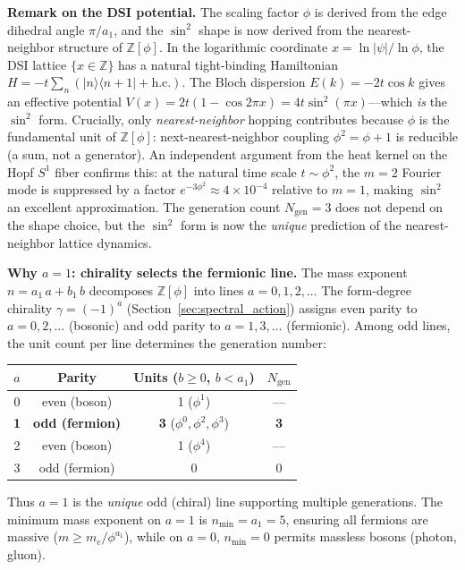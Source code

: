 \documentclass[12pt,a4paper]{article}
\theoremstyle{definition}
\begin{document}
\textbf{Remark on the DSI potential.} The scaling factor $\phi$ is derived from the edge dihedral angle $\pi/a_1$, and the $\sin^2$ shape is now derived from the nearest-neighbor structure of $\mathbb{Z}[\phi]$.  In the logarithmic coordinate $x = \ln|\psi|/\ln\phi$, the DSI lattice $\{x \in \mathbb{Z}\}$ has a natural tight-binding Hamiltonian $H = -t\sum_n(|n\rangle\langle n\!+\!1| + \text{h.c.})$.  The Bloch dispersion $E(k) = -2t\cos k$ gives an effective potential $V(x) = 2t(1 - \cos 2\pi x) = 4t\sin^2(\pi x)$---which \emph{is} the $\sin^2$ form.  Crucially, only \emph{nearest-neighbor} hopping contributes because $\phi$ is the fundamental unit of $\mathbb{Z}[\phi]$: next-nearest-neighbor coupling $\phi^2 = \phi + 1$ is reducible (a sum, not a generator).  An independent argument from the heat kernel on the Hopf $S^1$ fiber confirms this: at the natural time scale $t \sim \phi^2$, the $m = 2$ Fourier mode is suppressed by a factor $e^{-3\phi^2} \approx 4 \times 10^{-4}$ relative to $m = 1$, making $\sin^2$ an excellent approximation.  The generation count $N_{\text{gen}} = 3$ does not depend on the shape choice, but the $\sin^2$ form is now the \emph{unique} prediction of the nearest-neighbor lattice dynamics.

\textbf{Why $a = 1$: chirality selects the fermionic line.}  The mass exponent $n = a_1\,a + b_1\,b$ decomposes $\mathbb{Z}[\phi]$ into lines $a = 0, 1, 2, \ldots$  The form-degree chirality $\gamma = (-1)^a$ (Section~\ref{sec:spectral_action}) assigns even parity to $a = 0, 2, \ldots$ (bosonic) and odd parity to $a = 1, 3, \ldots$ (fermionic).  Among odd lines, the unit count per line determines the generation number:
\begin{center}
\begin{tabular}{cccc}
\toprule
$a$ & Parity & Units ($b \geq 0$, $b < a_1$) & $N_{\text{gen}}$ \\
\midrule
0 & even (boson) & 1 ($\phi^1$) & --- \\
\textbf{1} & \textbf{odd (fermion)} & \textbf{3} ($\phi^0, \phi^2, \phi^3$) & \textbf{3} \\
2 & even (boson) & 1 ($\phi^4$) & --- \\
3 & odd (fermion) & 0 & 0 \\
\bottomrule
\end{tabular}
\end{center}
Thus $a = 1$ is the \emph{unique} odd (chiral) line supporting multiple generations.  The minimum mass exponent on $a = 1$ is $n_{\min} = a_1 = 5$, ensuring all fermions are massive ($m \geq m_e/\phi^{a_1}$), while on $a = 0$, $n_{\min} = 0$ permits massless bosons (photon, gluon).
\end{document}
